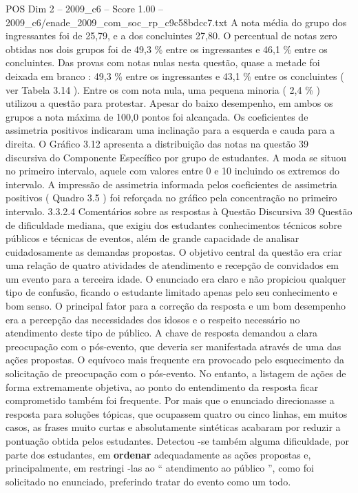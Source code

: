 \begin{textsample}{POS Dim 2 – 2009\_c6 – Score 1.00 – 2009\_c6/enade\_2009\_com\_soc\_rp\_c9c58bdcc7.txt}
A nota média do grupo dos ingressantes foi de 25,79, e a dos concluintes 27,80.
O percentual de notas zero obtidas nos dois grupos foi de 49,3 \% entre os ingressantes e 46,1 \% entre os concluintes.
Das provas com notas nulas nesta questão, quase a metade foi deixada em branco : 49,3 \% entre os ingressantes e 43,1 \% entre os concluintes ( ver Tabela 3.14 ).
Entre os com nota nula, uma pequena minoria ( 2,4 \% ) utilizou a questão para protestar.
Apesar do baixo desempenho, em ambos os grupos a nota máxima de 100,0 pontos foi alcançada.
Os coeficientes de assimetria positivos indicaram uma inclinação para a esquerda e cauda para a direita.
O Gráfico 3.12 apresenta a distribuição das notas na questão 39 discursiva do Componente Específico por grupo de estudantes.
A moda se situou no primeiro intervalo, aquele com valores entre 0 e 10 incluindo os extremos do intervalo.
A impressão de assimetria informada pelos coeficientes de assimetria positivos ( Quadro 3.5 ) foi reforçada no gráfico pela concentração no primeiro intervalo. 3.3.2.4 Comentários sobre as respostas à Questão Discursiva 39 Questão de dificuldade mediana, que exigiu dos estudantes conhecimentos técnicos sobre públicos e técnicas de eventos, além de grande capacidade de analisar cuidadosamente as demandas propostas.
O objetivo central da questão era criar uma relação de quatro atividades de atendimento e recepção de convidados em um evento para a terceira idade.
O enunciado era claro e não propiciou qualquer tipo de confusão, ficando o estudante limitado apenas pelo seu conhecimento e bom senso.
O principal fator para a correção da resposta e um bom desempenho era a percepção das necessidades dos idosos e o respeito necessário no atendimento deste tipo de público.
A chave de resposta demandou a clara preocupação com o pós-evento, que deveria ser manifestada através de uma das ações propostas.
O equívoco mais frequente era provocado pelo esquecimento da solicitação de preocupação com o pós-evento.
No entanto, a listagem de ações de forma extremamente objetiva, ao ponto do entendimento da resposta ficar comprometido também foi frequente.
Por mais que o enunciado direcionasse a resposta para soluções tópicas, que ocupassem quatro ou cinco linhas, em muitos casos, as frases muito curtas e absolutamente sintéticas acabaram por reduzir a pontuação obtida pelos estudantes.
Detectou -se também alguma dificuldade, por parte dos estudantes, em \textbf{ordenar} adequadamente as ações propostas e, principalmente, em restringi -las ao “ atendimento ao público ”, como foi solicitado no enunciado, preferindo tratar do evento como um todo.

\end{textsample}
